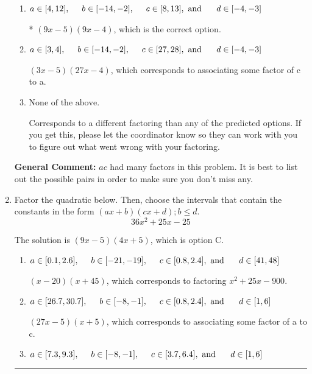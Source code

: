 \documentclass{extbook}[14pt]
\newcommand{\litem}[1]{\item #1

\rule{\textwidth}{0.4pt}}
\begin{document}
\begin{enumerate}
{\begin{enumerate}[label=\Alph*.]
 $(27x -5)(3x -4)$, which corresponds to associating some factor of a to c.
\item \( a \in [4, 12], \hspace*{5mm} b \in [-14, -2], \hspace*{5mm} c \in [8, 13], \text{ and } \hspace*{5mm} d \in [-4, -3] \)

* $(9x -5)(9x -4)$, which is the correct option.
\item \( a \in [3, 4], \hspace*{5mm} b \in [-14, -2], \hspace*{5mm} c \in [27, 28], \text{ and } \hspace*{5mm} d \in [-4, -3] \)

 $(3x -5)(27x -4)$, which corresponds to associating some factor of c to a.
\item \( \text{None of the above.} \)

 Corresponds to a different factoring than any of the predicted options. If you get this, please let the coordinator know so they can work with you to figure out what went wrong with your factoring.
\end{enumerate}

\textbf{General Comment:} $ac$ had many factors in this problem. It is best to list out the possible pairs in order to make sure you don't miss any.
}
\litem{
Factor the quadratic below. Then, choose the intervals that contain the constants in the form $(ax+b)(cx+d); b \leq d.$
\[ 36x^{2} +25 x -25 \]

The solution is \( (9x -5)(4x + 5) \), which is option C.\begin{enumerate}[label=\Alph*.]
\item \( a \in [0.1, 2.6], \hspace*{5mm} b \in [-21, -19], \hspace*{5mm} c \in [0.8, 2.4], \text{ and } \hspace*{5mm} d \in [41, 48] \)

 $(x -20)(x + 45)$, which corresponds to factoring $x^{2} +25 x -900$.
\item \( a \in [26.7, 30.7], \hspace*{5mm} b \in [-8, -1], \hspace*{5mm} c \in [0.8, 2.4], \text{ and } \hspace*{5mm} d \in [1, 6] \)

 $(27x -5)(x + 5)$, which corresponds to associating some factor of a to c.
\item \( a \in [7.3, 9.3], \hspace*{5mm} b \in [-8, -1], \hspace*{5mm} c \in [3.7, 6.4], \text{ and } \hspace*{5mm} d \in [1, 6] \)


\end{enumerate}}
\end{enumerate}
\end{document}
